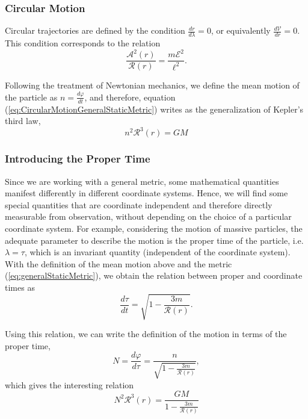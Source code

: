 \subsubsection{Circular Motion}
Circular trajectories are defined by the condition $\frac{dr}{d\lambda} = 0$, or equivalently $\frac{d\mathcal{V}}{dr} = 0$. This condition corresponds to the relation
\begin{equation}
\frac{\mathcal{A}^2 (r)}{\mathcal{R}(r)}= \frac{m\mathcal{E}^2}{\ell^2 } . \label{eq:CircularMotionGeneralStaticMetric}
\end{equation}

Following the treatment of Newtonian mechanics, we define the mean motion of the particle as $
n = \frac{d\varphi}{dt}$,
and therefore, equation (\ref{eq:CircularMotionGeneralStaticMetric}) writes as the generalization of Kepler's third law,
\begin{equation}
 n^2 \mathcal{R}^3(r) = GM
 \end{equation} 

\subsubsection{Introducing the Proper Time}
Since we are working with a general metric, some mathematical quantities manifest differently in different coordinate systems. Hence, we will find some special quantities that are coordinate independent and therefore directly measurable from observation, without depending on the choice of a particular coordinate system. For example, considering the motion of massive particles, the adequate parameter to describe the motion is the proper time of the particle, i.e. $\lambda = \tau$, which is an invariant quantity (independent of the coordinate system). With the definition of the mean motion above and the metric (\ref{eq:generalStaticMetric}), we obtain the relation between proper and coordinate times as
\begin{equation}
\frac{d\tau}{dt} = \sqrt{1 - \frac{3m}{\mathcal{R}(r)}}.
\end{equation}

Using this relation, we can write the definition of the motion in terms of the proper time,
\begin{equation}
 N = \frac{d\varphi}{d\tau} = \frac{n}{\sqrt{1 - \frac{3m}{\mathcal{R}(r)}}},
 \end{equation} 
which gives the interesting relation
\begin{equation}
N^2 \mathcal{R}^3(r)= \frac{GM}{1 - \frac{3m}{\mathcal{R}(r)}} 
\end{equation}


